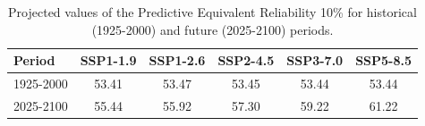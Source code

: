 \begin{table}[htbp]
\centering
\begin{tabular}{lccccc}
\toprule
Period & \textbf{SSP1-1.9} & \textbf{SSP1-2.6} & \textbf{SSP2-4.5} & \textbf{SSP3-7.0} & \textbf{SSP5-8.5} \\
\midrule
1925-2000 & 53.41 & 53.47 & 53.45 & 53.44 & 53.44 \\
2025-2100 & 55.44 & 55.92 & 57.30 & 59.22 & 61.22 \\
\bottomrule
\end{tabular}
\caption{Projected values of the Predictive Equivalent Reliability 10\% for historical (1925-2000) and future (2025-2100) periods.}
\label{tab:pred_scenarios_10per}
\end{table}